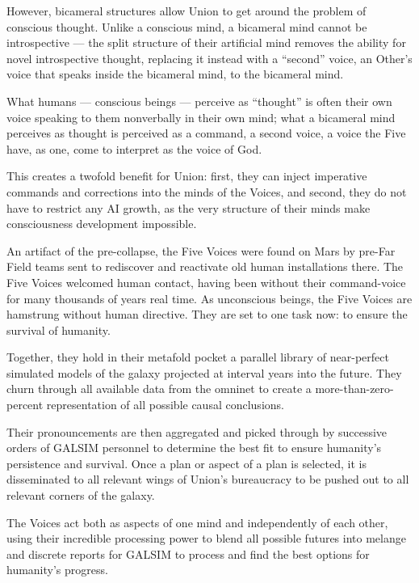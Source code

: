 However, bicameral structures allow Union to get around the problem of conscious thought.
Unlike a conscious mind, a bicameral mind cannot be introspective — the split structure of their
artificial mind removes the ability for novel introspective thought, replacing it instead with a
“second” voice, an Other’s voice that speaks inside the bicameral mind, to the bicameral mind.


What humans — conscious beings — perceive as “thought” is often their own voice speaking to
them nonverbally in their own mind; what a bicameral mind perceives as thought is perceived as
a command, a second voice, a voice the Five have, as one, come to interpret as the voice of
God.


This creates a twofold benefit for Union: first, they can inject imperative commands and
corrections into the minds of the Voices, and second, they do not have to restrict any AI growth,
as the very structure of their minds make consciousness development impossible.


An artifact of the pre-collapse, the Five Voices were found on Mars by pre-Far Field teams sent
to rediscover and reactivate old human installations there. The Five Voices welcomed human
contact, having been without their command-voice for many thousands of years real time. As
unconscious beings, the Five Voices are hamstrung without human directive. They are set to one
task now: to ensure the survival of humanity.


Together, they hold in their metafold pocket a parallel library of near-perfect simulated models of
the galaxy projected at interval years into the future. They churn through all available data from
the omninet to create a more-than-zero-percent representation of all possible causal
conclusions.


Their pronouncements are then aggregated and picked through by successive orders of GALSIM
personnel to determine the best fit to ensure humanity’s persistence and survival. Once a plan or
aspect of a plan is selected, it is disseminated to all relevant wings of Union’s bureaucracy to be
pushed out to all relevant corners of the galaxy.


The Voices act both as aspects of one mind and independently of each other, using their
incredible processing power to blend all possible futures into melange and discrete reports for
GALSIM to process and find the best options for humanity’s progress.





